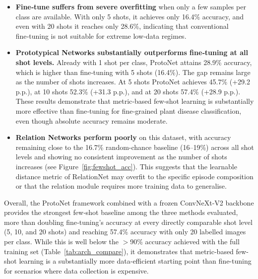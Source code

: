 \begin{itemize}
    \item \textbf{Fine‑tune suffers from severe overfitting} when only a few samples per class are available. With only 5 shots, it achieves only 16.4\% accuracy, and even with 20 shots it reaches only 28.6\%, indicating that conventional fine‑tuning is not suitable for extreme low‑data regimes.
    
    \item \textbf{Prototypical Networks substantially outperforms fine‑tuning at all shot levels.} Already with 1 shot per class, ProtoNet attains 28.9\% accuracy, which is higher than fine‑tuning with 5 shots (16.4\%). The gap remains large as the number of shots increases. At 5 shots ProtoNet achieves 45.7\% (+29.2 p.p.), at 10 shots 52.3\% (+31.3 p.p.), and at 20 shots 57.4\% (+28.9 p.p.). These results demonstrate that metric‑based few‑shot learning is substantially more effective than fine‑tuning for fine‑grained plant disease classification, even though absolute accuracy remains moderate.
    
    \item \textbf{Relation Networks perform poorly} on this dataset, with accuracy remaining close to the 16.7\% random-chance baseline (16–19\%) across all shot levels and showing no consistent improvement as the number of shots increases (see Figure~\ref{fig:fewshot_acc}). This suggests that the learnable distance metric of RelationNet may overfit to the specific episode composition or that the relation module requires more training data to generalise.
\end{itemize}

Overall, the ProtoNet framework combined with a frozen ConvNeXt‑V2 backbone provides the strongest few‑shot baseline among the three methods evaluated, more than doubling fine‑tuning's accuracy at every directly comparable shot level (5, 10, and 20 shots) and reaching 57.4\% accuracy with only 20 labelled images per class. While this is well below the $>$90\% accuracy achieved with the full training set (Table~\ref{tab:arch_compare}), it demonstrates that metric-based few-shot learning is a substantially more data-efficient starting point than fine-tuning for scenarios where data collection is expensive.


